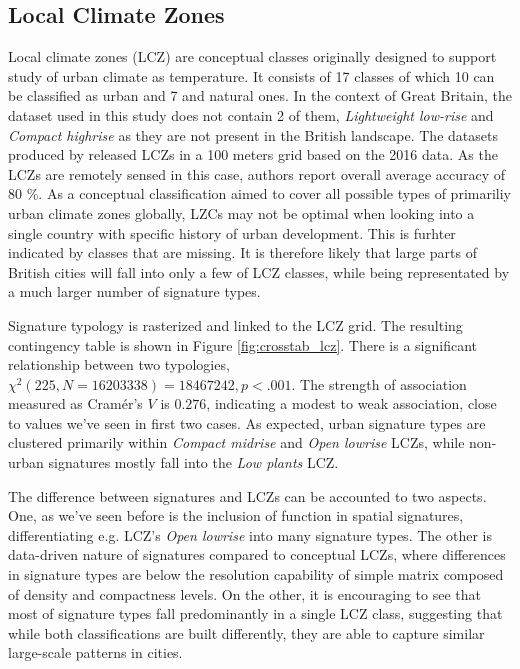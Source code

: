 \documentclass[fleqn,10pt]{wlscirep}
\begin{document}
\subsection*{Local Climate Zones}
Local climate zones (LCZ) are conceptual classes originally designed to support study of urban
climate as temperature. It consists of 17 classes of which 10 can be classified as urban
and 7 and natural ones. In the context of Great Britain, the dataset used in this study
does not contain 2 of them, \textit{Lightweight low-rise} and \textit{Compact highrise}
as they are not present in the British landscape. The datasets produced by
\cite{demuzere2019mapping} released LCZs in a 100 meters grid based on the 2016 data. As
the LCZs are remotely sensed in this case, authors report overall average accuracy of 80 \%.
As a conceptual classification aimed to cover all possible types of primariliy urban climate zones globally,
LZCs may not be optimal when looking into a single country with specific history of urban
development. This is furhter indicated by classes that are missing. It is therefore likely
that large parts of British cities will fall into only a few of LCZ classes, while being representated
by a much larger number of signature types.

Signature typology is rasterized and linked to the LCZ grid.
The resulting contingency table is shown in Figure \ref{fig:crosstab_lcz}. There is a
significant relationship between two typologies, $\chi^{2} (225, N = 16203338) = 18467242,
p < .001$. The strength of association measured as Cramér's $V$ is $0.276$, indicating
a modest to weak association, close to values we've seen in first two cases. As expected,
urban signature types are clustered primarily within \textit{Compact midrise} and
\textit{Open lowrise} LCZs, while non-urban signatures mostly fall into the \textit{Low plants} LCZ.

The difference between signatures and LCZs can be accounted to two aspects. One, as we've seen
before is the inclusion of function in spatial signatures, differentiating e.g. LCZ's \textit{Open lowrise} into
many signature types. The other is data-driven nature of signatures compared to conceptual LCZs,
where differences in signature types are below the resolution capability of simple matrix composed of
density and compactness levels. On the other, it is encouraging to see that most of signature types
fall predominantly in a single LCZ class, suggesting that while both classifications are built differently,
they are able to capture similar large-scale patterns in cities.
\end{document}
